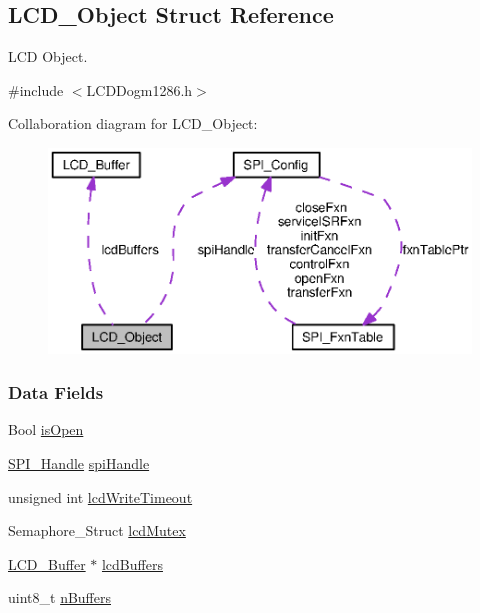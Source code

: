 \subsection{L\+C\+D\+\_\+\+Object Struct Reference}
\label{struct_l_c_d___object}


L\+C\+D Object.  




{\ttfamily \#include $<$L\+C\+D\+Dogm1286.\+h$>$}



Collaboration diagram for L\+C\+D\+\_\+\+Object\+:
\nopagebreak
\begin{figure}[H]
\begin{center}
\leavevmode
\includegraphics[width=350pt]{struct_l_c_d___object__coll__graph}
\end{center}
\end{figure}
\subsubsection*{Data Fields}
\begin{DoxyCompactItemize}
\item 
Bool \hyperlink{struct_l_c_d___object_a694bdda5d369af24f065f697b95cc41f}{is\+Open}
\item 
\hyperlink{_s_p_i_8h_a728806534c3c3e8675cfbfb7d8e36f13}{S\+P\+I\+\_\+\+Handle} \hyperlink{struct_l_c_d___object_ae5a83e239d37d34cf7c111cb879ab237}{spi\+Handle}
\item 
unsigned int \hyperlink{struct_l_c_d___object_acb3f2edac00d7ef0a0cf2dc9b0ba3160}{lcd\+Write\+Timeout}
\item 
Semaphore\+\_\+\+Struct \hyperlink{struct_l_c_d___object_a39cc695912368d6f9c72ba51fa34719e}{lcd\+Mutex}
\item 
\hyperlink{struct_l_c_d___buffer}{L\+C\+D\+\_\+\+Buffer} $\ast$ \hyperlink{struct_l_c_d___object_acf7322679a62a6a8f0d0c26363d33696}{lcd\+Buffers}
\item 
uint8\+\_\+t \hyperlink{struct_l_c_d___object_aaedc411a324d3ada993422793871a919}{n\+Buffers}
\end{DoxyCompactItemize}


